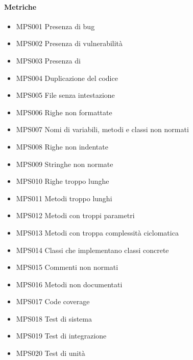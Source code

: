 		\paragraph*{Metriche} 
		\begin{itemize}
			\item MPS001 Presenza di bug
			\item MPS002 Presenza di vulnerabilità
			\item MPS003 Presenza di 
			\item MPS004 Duplicazione del codice
            \item MPS005 File senza intestazione
            \item MPS006 Righe non formattate
            \item MPS007 Nomi di variabili, metodi e classi non normati
            \item MPS008 Righe non indentate
            \item MPS009 Stringhe non normate
            \item MPS010 Righe troppo lunghe
            \item MPS011 Metodi troppo lunghi
            \item MPS012 Metodi con troppi parametri
            \item MPS013 Metodi con troppa complessità ciclomatica
            \item MPS014 Classi che implementano classi concrete
            \item MPS015 Commenti non normati
            \item MPS016 Metodi non documentati
            \item MPS017 Code coverage
            \item MPS018 Test di sistema
            \item MPS019 Test di integrazione
            \item MPS020 Test di unità
		\end{itemize} 

